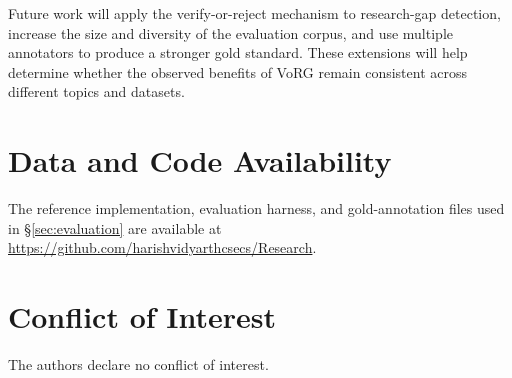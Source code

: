 \documentclass[11pt]{article}
\begin{document}
Future work will apply the verify-or-reject mechanism to research-gap detection, increase the size and diversity of the evaluation corpus, and use multiple annotators to produce a stronger gold standard. These extensions will help determine whether the observed benefits of VoRG remain consistent across different topics and datasets.

\section*{Data and Code Availability}

The reference implementation, evaluation harness, and gold-annotation files used in \S\ref{sec:evaluation} are available at \url{https://github.com/harishvidyarthcsecs/Research}.

\section*{Conflict of Interest}

The authors declare no conflict of interest.



\end{document}
